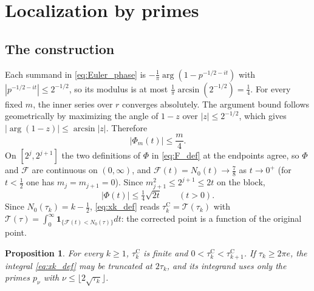 \documentclass[11pt,a4paper]{article}
\makeatletter
\numberwithin{equation}{section}
\DeclareRobustCommand{\CGeqref}[1]{\eqref{#1}}
\let\CG@origeqref\eqref
\newcommand{\CG@gettip}[1]{\@ifundefined{CGTip@#1}{#1}{\csname CGTip@#1\endcsname}}
\DeclareRobustCommand{\CGeqref}[1]{\pdftooltip{\CG@origeqref{#1}}{\CG@gettip{#1}}}
\newtheorem{proposition}[theorem]{Proposition}
\theoremstyle{definition}
\theoremstyle{remark}
\newcommand{\Nz}{N_0} %
\newcommand{\Fc}{\mathcal F}
\newcommand{\Tc}{\mathcal T}
\newcommand{\Ph}{\Phi}
\newcommand{\Ind}{\mathbf 1}
\makeatother
\begin{document}
\section{Localization by primes}\label{sec:sublevel}

\subsection{The construction}\label{subsec:construction}
Each summand in \CGeqref{eq:Euler_phase} is $-\frac1\pi\arg(1-p^{-1/2-it})$ with $|p^{-1/2-it}|\le2^{-1/2}$, so its modulus is at most $\frac1\pi\arcsin(2^{-1/2})=\frac14$. For every fixed $m$, the inner series over $r$ converges absolutely. The argument bound follows geometrically by maximizing the angle of $1-z$ over $|z|\le2^{-1/2}$, which gives $|\arg(1-z)|\le\arcsin|z|$. Therefore
\begin{equation}
|\Ph_m(t)|\le\frac m4 .
\label{eq:phasebound}
\end{equation}
On $[2^j,2^{j+1}]$ the two definitions of $\Ph$ in \CGeqref{eq:F_def} at the endpoints agree, so $\Ph$ and $\Fc$ are continuous on $(0,\infty)$, and $\Fc(t)=\Nz(t)\to\frac78$ as $t\to0^+$ (for $t<\frac12$ one has $m_j=m_{j+1}=0$). Since $m_{j+1}^2\le2^{j+1}\le2t$ on the block,
\begin{equation}
|\Ph(t)|\le\tfrac14\sqrt{2t}\qquad(t>0).
\label{eq:globalphasebound}
\end{equation}
Since $\Nz(\tau_k)=k-\frac12$, \CGeqref{eq:xk_def} reads $\tau_{k}^{\mathrm C}=\Tc(\tau_k)$ with $\Tc(\tau)=\int_0^\infty\Ind_{\{\Fc(t)<\Nz(\tau)\}}dt$: the corrected point is a function of the original point.

\begin{proposition}\label{prop:ordered}
For every $k\ge1$, $\tau_{k}^{\mathrm C}$ is finite and $0<\tau_{k}^{\mathrm C}<\tau_{k+1}^{\mathrm C}$. If $\tau_k\ge2\pi e$, the integral \CGeqref{eq:xk_def} may be truncated at $2\tau_k$, and its integrand uses only the primes $p_\nu$ with $\nu\le\lfloor2\sqrt{\tau_k}\rfloor$.
\end{proposition}
\end{document}
